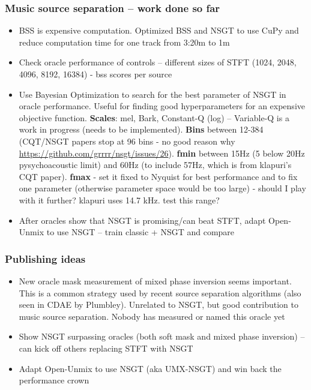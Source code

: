 \documentclass[usenames,dvipsnames]{beamer}
\begin{document}
\begin{frame}
	\frametitle{Music source separation -- work done so far}
	\begin{itemize}
		\item
			BSS is expensive computation. Optimized BSS and NSGT to use CuPy and reduce computation time for one track from 3:20m to 1m
		\item
			Check oracle performance of controls -- different sizes of STFT (1024, 2048, 4096, 8192, 16384) - bss scores per source
		\item
			Use Bayesian Optimization to search for the best parameter of NSGT in oracle performance. Useful for finding good hyperparameters for an expensive objective function. \textbf{Scales}: mel, Bark, Constant-Q (log) -- Variable-Q is a work in progress (needs to be implemented). \textbf{Bins} between 12-384 (CQT/NSGT papers stop at 96 bins - no good reason why \href{https://github.com/grrrr/nsgt/issues/26}{https://github.com/grrrr/nsgt/issues/26}). \textbf{fmin} between 15Hz (5 below 20Hz pysychoacoustic limit) and 60Hz (to include 57Hz, which is from klapuri's CQT paper). \textbf{fmax} - set it fixed to Nyquist for best performance and to fix one parameter (otherwise parameter space would be too large) - should I play with it further? klapuri uses 14.7 kHz. test this range?
		\item
			After oracles show that NSGT is promising/can beat STFT, adapt Open-Unmix to use NSGT -- train classic + NSGT and compare
	\end{itemize}
\end{frame}

\begin{frame}
	\frametitle{Publishing ideas}
	\begin{itemize}
		\item
			New oracle mask measurement of mixed phase inversion seems important. This is a common strategy used by recent source separation algorithms (also seen in CDAE by Plumbley). Unrelated to NSGT, but good contribution to music source separation. Nobody has measured or named this oracle yet
		\item
			Show NSGT surpassing oracles (both soft mask and mixed phase inversion) -- can kick off others replacing STFT with NSGT
		\item
			Adapt Open-Unmix to use NSGT (aka UMX-NSGT) and win back the performance crown
	\end{itemize}
\end{frame}
\end{document}
